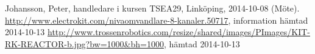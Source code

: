 \begin{thebibliography}{9}
 Johansson, Peter, handledare i kursen TSEA29, Linköping, 2014-10-08 (Möte).
 \url{http://www.electrokit.com/nivaomvandlare-8-kanaler.50717}, information hämtad 2014-10-13
 \url{http://www.trossenrobotics.com/resize/shared/images/PImages/KIT-RK-REACTOR-b.jpg?bw=1000&bh=1000}, hämtad 2014-10-13
\end{thebibliography}